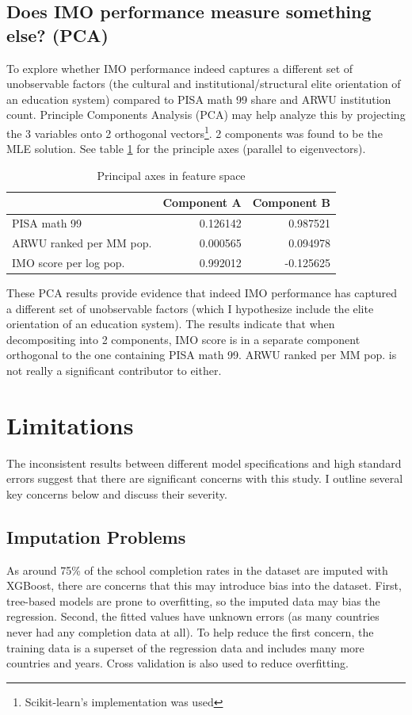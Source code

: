 \documentclass[11pt]{article}
\begin{document}
\subsection{Does IMO performance measure something else? (PCA)}
To explore whether IMO performance indeed captures a different set of unobservable factors (the cultural and institutional/structural elite orientation of an education system) compared to PISA math 99 share and ARWU institution count. Principle Components Analysis (PCA) may help analyze this by projecting the 3 variables onto 2 orthogonal vectors\footnote{Scikit-learn's implementation was used}. 2 components was found to be the MLE solution. See table \ref{table:pca} for the principle axes (parallel to eigenvectors).
\begin{table}[H]
    \caption{Principal axes in feature space}
    \label{table:pca}
    \centering
    \begin{tabular}{lrr}
        \toprule
         & Component A & Component B \\
        \midrule
        PISA math 99 & 0.126142 & 0.987521 \\
        ARWU ranked per MM pop. & 0.000565 & 0.094978 \\
        IMO score per log pop. & 0.992012 & -0.125625 \\
        \bottomrule
    \end{tabular}
\end{table}

These PCA results provide evidence that indeed IMO performance has captured a different set of unobservable factors (which I hypothesize include the elite orientation of an education system). The results indicate that when decompositing into 2 components, IMO score is in a separate component orthogonal to the one containing PISA math 99. ARWU ranked per MM pop. is not really a significant contributor to either.

\section{Limitations}
The inconsistent results between different model specifications and high standard errors suggest that there are significant concerns with this study. I outline several key concerns below and discuss their severity.

\subsection{Imputation Problems}
As around 75\% of the school completion rates in the dataset are imputed with XGBoost, there are concerns that this may introduce bias into the dataset. First, tree-based models are prone to overfitting, so the imputed data may bias the regression. Second, the fitted values have unknown errors (as many countries never had any completion data at all). To help reduce the first concern, the training data is a superset of the regression data and includes many more countries and years. Cross validation is also used to reduce overfitting.
\end{document}
